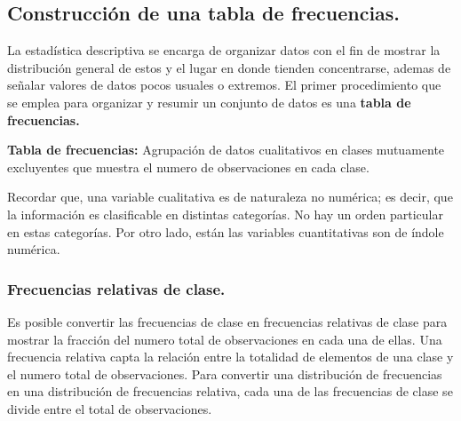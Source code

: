 \documentclass[]{article}
\begin{document}
\subsection{Construcción de una tabla de frecuencias.}
La estadística descriptiva se encarga de organizar datos con el fin de mostrar la distribución general de estos y el lugar en donde tienden concentrarse, ademas de señalar valores de datos pocos usuales o extremos. El primer procedimiento que se emplea para organizar y resumir un conjunto de datos es una \textbf{tabla de frecuencias.}
\begin{center}
\textbf{Tabla de frecuencias:} Agrupación de datos cualitativos en clases mutuamente excluyentes que muestra el numero de observaciones en cada clase.
\end{center}
Recordar que, una variable cualitativa es de naturaleza no numérica; es decir, que la información es clasificable en distintas categorías. No hay un orden particular en estas categorías. Por otro lado, están las variables cuantitativas son de índole numérica.
\subsubsection*{Frecuencias relativas de clase.}
Es posible convertir las frecuencias de clase en frecuencias relativas de clase para mostrar la fracción del numero total de observaciones en cada una de ellas. Una frecuencia relativa capta la relación entre la totalidad de elementos de una clase y el numero total de observaciones. Para convertir una distribución de frecuencias en una distribución de frecuencias relativa, cada una de las frecuencias de clase se divide entre el total de observaciones.
\end{document}
